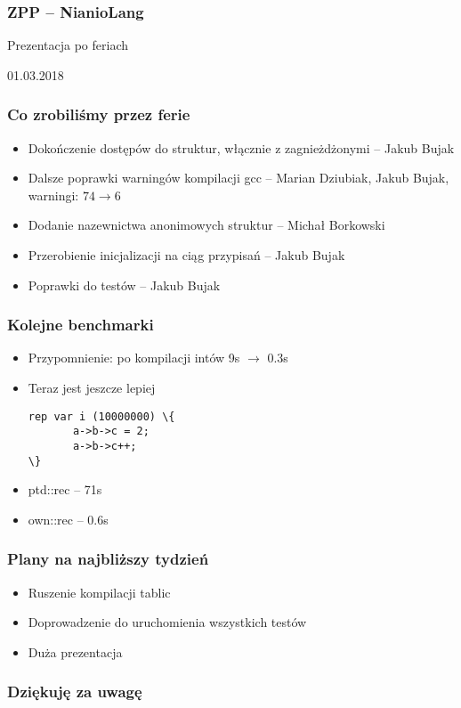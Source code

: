 \documentclass{beamer}
\begin{document}
	\begin{frame}
		\frametitle{ZPP -- NianioLang}
		Prezentacja po feriach
		
		01.03.2018
	\end{frame}
	
	\begin{frame}
		\frametitle{Co zrobiliśmy przez ferie}
		\begin{itemize}
			\item Dokończenie dostępów do struktur, włącznie z zagnieżdżonymi -- Jakub Bujak
			\item Dalsze poprawki warningów kompilacji gcc -- Marian Dziubiak, Jakub Bujak, warningi:
			$74 \rightarrow 6$
			\item Dodanie nazewnictwa anonimowych struktur -- Michał Borkowski
			\item Przerobienie inicjalizacji na ciąg przypisań -- Jakub Bujak
			\item Poprawki do testów -- Jakub Bujak
		\end{itemize}
	\end{frame}
	
	\begin{frame}[fragile]
		\frametitle{Kolejne benchmarki}
		\begin{itemize}
			\item Przypomnienie: po kompilacji intów 9s $\rightarrow$ 0.3s
			\item Teraz jest jeszcze lepiej
			\begin{Verbatim}[commandchars=\\\{\}]
rep var i (10000000) \{
       a->b->c = 2;
       a->b->c++;
\}
			\end{Verbatim}
			\pause
			\item ptd::rec -- 71s
			\item own::rec -- 0.6s
		\end{itemize}

	\end{frame}

	
	\begin{frame}
		\frametitle{Plany na najbliższy tydzień}
		\begin{itemize}
			\item Ruszenie kompilacji tablic
			\item Doprowadzenie do uruchomienia wszystkich testów
			\item Duża prezentacja
		\end{itemize}
	\end{frame}

	\begin{frame}
	 \frametitle{Dziękuję za uwagę}
	\end{frame}
\end{document}
